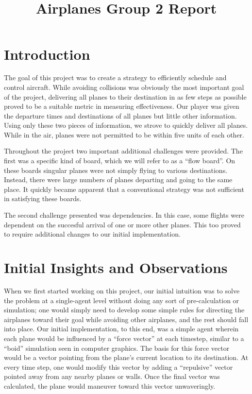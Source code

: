 \documentclass[10pt]{article}
\title{Airplanes Group 2 Report}
\author{\myname}
\begin{document}
\pagestyle{empty}
\maketitle

\newpage
\pagestyle{fancy}
\setlength\headheight{60pt}
\setcounter{tocdepth}{3}
\tableofcontents

\newpage
\section{Introduction}

The goal of this project was to create a strategy to efficiently schedule and control aircraft. While avoiding collisions was obviously the most important goal of the project, delivering all planes to their destination in as few steps as possible proved to be a suitable metric in measuring effectiveness. Our player was given the departure times and destinations of all planes but little other information. Using only these two pieces of information, we strove to quickly deliver all planes. While in the air, planes were not permitted to be within five units of each other.

Throughout the project two important additional challenges were provided. The first was a specific kind of board, which we will refer to as a ``flow board''. On these boards singular planes were not simply flying to various destinations. Instead, there were large numbers of planes departing and going to the same place. It quickly became apparent that a conventional strategy was not sufficient in satisfying these boards.

The second challenge presented was dependencies. In this case, some flights were dependent on the succesful arrival of one or more other planes. This too proved to require additional changes to our initial implementation.

\newpage
\section{Initial Insights and Observations}
When we first started working on this project, our initial intuition was to
solve the problem at a single-agent level without doing any sort of
pre-calculation or simulation; one would simply need to develop some simple
rules for directing the airplanes toward their goal while avoiding other
airplanes, and the rest should fall into place. Our initial implementation, to
this end, was a simple agent wherein each plane would be influenced by a ``force
vector'' at each timestep, similar to a ``boid'' simulation seen in computer
graphics. The basis for this force vector would be a vector pointing from the
plane's current location to its destination. At every time step, one would
modify this vector by adding a ``repulsive'' vector pointed away from any nearby
planes or walls. Once the final vector was calculated, the plane would maneuver
toward this vector unwaveringly. \\\\
\end{document}
